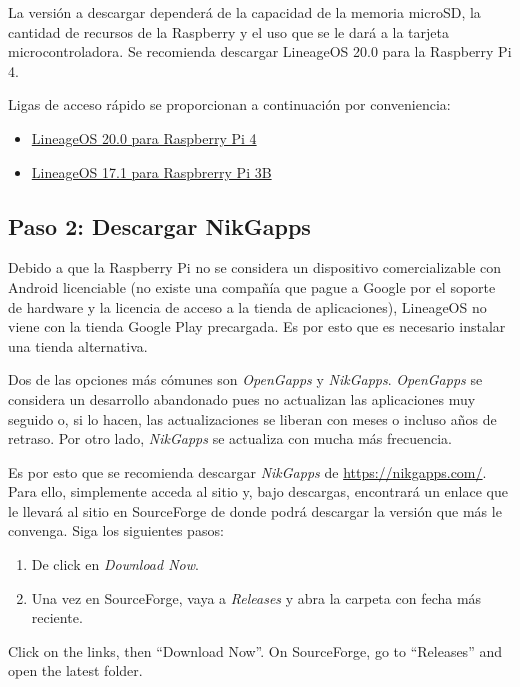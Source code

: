 \documentclass[letterpaper,10.5pt]{article}
\begin{document}
La versión a descargar dependerá de la capacidad de la memoria microSD, la cantidad de recursos de la Raspberry y el uso que se le dará a la tarjeta microcontroladora.
Se recomienda descargar LineageOS 20.0 para la Raspberry Pi 4.

Ligas de acceso rápido se proporcionan a continuación por conveniencia:

\begin{itemize}[noitemsep]
	\item \href{https://www.androidfilehost.com/?fid=4279422670115708605}{LineageOS 20.0 para Raspberry Pi 4}
	\item \href{https://www.androidfilehost.com/?fid=10763459528675579938}{LineageOS 17.1 para Raspbrerry Pi 3B}
\end{itemize}


%
%
\subsection{Paso 2: Descargar NikGapps}%
Debido a que la Raspberry Pi no se considera un dispositivo comercializable con Android licenciable (no existe una compañía que pague a Google por el soporte de hardware y la licencia de acceso a la tienda de aplicaciones), LineageOS no viene con la tienda Google Play precargada.
Es por esto que es necesario instalar una tienda alternativa.

Dos de las opciones más cómunes son \emph{OpenGapps} y \emph{NikGapps}.
\emph{OpenGapps} se considera un desarrollo abandonado pues no actualizan las aplicaciones muy seguido o, si lo hacen, las actualizaciones se liberan con meses o incluso años de retraso.
Por otro lado, \emph{NikGapps} se actualiza con mucha más frecuencia.

Es por esto que se recomienda descargar \emph{NikGapps} de \url{https://nikgapps.com/}.
Para ello, simplemente acceda al sitio y, bajo descargas, encontrará un enlace que le llevará al sitio en SourceForge de donde podrá descargar la versión que más le convenga.
Siga los siguientes pasos:
\begin{enumerate}[nosep]
	\item De click en \emph{Download Now}.
	\item Una vez en SourceForge, vaya a \emph{Releases} y abra la carpeta con fecha más reciente.

\end{enumerate}
    Click on the links, then “Download Now”.
    On SourceForge, go to “Releases” and open the latest folder.
\end{document}
